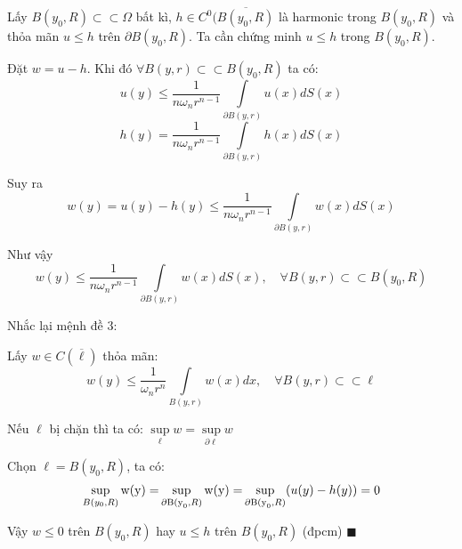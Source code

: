 Lấy $B(y_0,R) \subset  \subset \Omega $ bất kì, $h\in C^0(\overline{B(y_0,R)}$  là harmonic trong $B(y_0,R)$ và thỏa mãn $u \le h$ trên $\partial B(y_0,R)$.  Ta cần chứng minh $u\le h$ trong $B(y_0,R)$.

Đặt $w=u-h.$ Khi đó  $\forall  B(y,r) \subset  \subset B(y_0,R)$ ta có:
$$
u(y) \le\frac{1}{{n\omega _n r^{n - 1} }}\int\limits_{\partial B(y,r)} {u(x)dS(x)} 
$$
$$
h(y) =\frac{1}{{n\omega _n r^{n - 1} }}\int\limits_{\partial B(y,r)} {h(x)dS(x)} 
$$

Suy ra
$$ w(y)=u(y)-h(y) \le\frac{1}{{n\omega _n r^{n - 1} }}\int\limits_{\partial B(y,r)} {w(x)dS(x)} $$

Như vậy
$$ w(y)\le\frac{1}{{n\omega _n r^{n - 1} }}\int\limits_{\partial B(y,r)} {w(x)dS(x)},\quad\forall  B(y,r) \subset \subset B(y_0,R) $$

Nhắc lại mệnh đề 3:

Lấy $w \in C (\overline\ell  ) $ thỏa mãn:
$$w(y) \le \frac{1}{{\omega _n r^n }}\int\limits_{B(y,r)} {w(x)dx}, \quad \forall B(y,r) \subset\subset\ell $$

 Nếu $\ell $ bị chặn thì ta có: $\mathop {\sup }\limits_\ell  w = \mathop {\sup }\limits_{\partial \ell } w$
 
Chọn $\ell=B(y_0,R)$, ta có: $$\mathop {\sup }\limits_{B(y_0 ,R)} {\rm{w(y) = }}\mathop {{\rm{sup}}}\limits_{\partial {\rm{B(y}}_{\rm{0}} ,R)} {\rm{w(y) = }}\mathop {{\rm{sup}}}\limits_{\partial {\rm{B(y}}_{\rm{0}} ,R)} (u(y) - h(y)) = 0$$

Vậy $w\le 0$ trên $B(y_0,R)$ hay $u\le h$ trên $B(y_0,R)$ (đpcm) $\blacksquare$
\\


